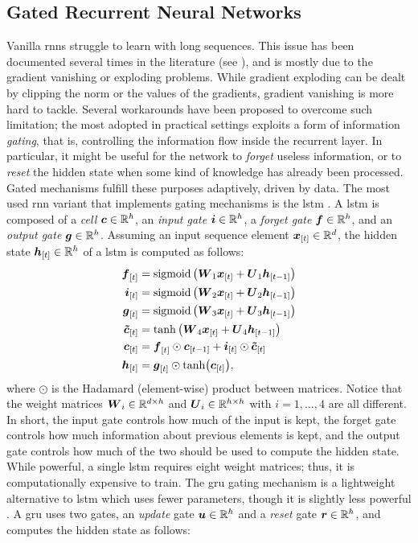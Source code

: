 \subsection{Gated Recurrent Neural Networks}
Vanilla \glspl{rnn} struggle to learn with long sequences. This issue has been documented several times in the literature (see \eg \citep{bengio1994learninglongtermdependenciesdifficult}), and is mostly due to the gradient vanishing or exploding problems. While gradient exploding can be dealt by clipping the norm or the values of the gradients, gradient vanishing is more hard to tackle. Several workarounds have been proposed to overcome such limitation; the most adopted in practical settings exploits a form of information \emph{gating}, that is, controlling the information flow inside the recurrent layer. In particular, it might be useful for the network to \emph{forget} useless information, or to \emph{reset} the hidden state when some kind of knowledge has already been processed. Gated mechanisms fulfill these purposes adaptively, driven by data. The most used \gls{rnn} variant that implements gating mechanisms is the \gls{lstm} \citep{hochreiter1997lstm}.
A \gls{lstm} is composed of a \emph{cell} $\Vector{c} \in \Real^h$, an \emph{input gate} $\Vector{i} \in \Real^h$, a \emph{forget gate} $\Vector{f} \in \Real^h$, and an \emph{output gate} $\Vector{g} \in \Real^h$. Assuming an input sequence element $\Elem{x}{t} \in \Real^d$, the hidden state $\Elem{h}{t} \in \Real^h$ of a \gls{lstm} is computed as follows:
\begin{align*}
    \Elem{f}{t} &= \sigmoid\Par{\Matrix{W}_{1}\Elem{x}{t} + \Matrix{U}_{1}\Elem{h}{t-1}}\\
    \Elem{i}{t} &= \sigmoid\Par{\Matrix{W}_{2}\Elem{x}{t} + \Matrix{U}_{2}\Elem{h}{t-1}}\\
    \Elem{g}{t} &= \sigmoid\Par{\Matrix{W}_{3}\Elem{x}{t} + \Matrix{U}_{3}\Elem{h}{t-1}}\\
    \Vector{\tilde{c}}_{[t]} &= \tanh\Par{\Matrix{W}_{4}\Elem{x}{t} + \Matrix{U}_{4}\Elem{h}{t-1}}\\
    \Elem{c}{t} &= \Elem{f}{t} \odot \Elem{c}{t-1} + \Elem{i}{t} \odot \Vector{\tilde{c}}_{[t]}\\
    \Elem{h}{t} &= \Elem{g}{t} \odot \tanh(\Elem{c}{t}),
\end{align*}
where $\odot$ is the Hadamard (element-wise) product between matrices. Notice that the weight matrices $\Matrix{W}_i \in \Real^{d \times h}$ and $\Matrix{U}_i \in \Real^{h \times h}$ with $i=1, \ldots, 4$ are all different. In short, the input gate controls how much of the input is kept, the forget gate controls how much information about previous elements is kept, and the output gate controls how much of the two should be used to compute the hidden state. While powerful, a single \gls{lstm} requires eight weight matrices; thus, it is computationally expensive to train. The \gls{gru} \citep{cho2014gru} gating mechanism is a lightweight alternative to \gls{lstm} which uses fewer parameters, though it is slightly less powerful \citep{gruber2020gruspecificlstm}. A \gls{gru} uses two gates, an \emph{update} gate $\Vector{u} \in \Real^h$ and a \emph{reset} gate $\Vector{r} \in \Real^h$, and computes the hidden state as follows:
